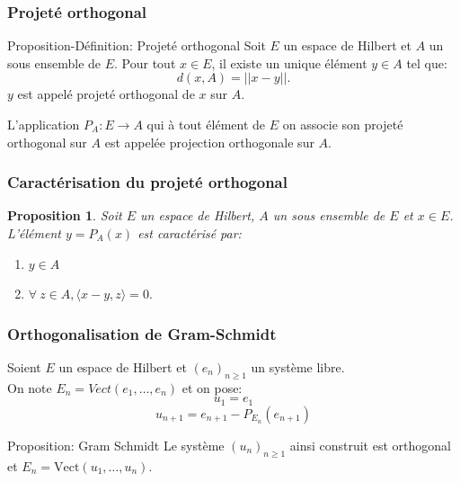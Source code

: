 \documentclass[xcolor=dvipsnames,10pt,mathserif]{beamer}
\theoremstyle{plain}
\newtheorem{pro}[thm]{Proposition}%
\newcommand{\la}{\langle}
\newcommand{\ra}{\rangle}
\begin{document}
\begin{frame} \frametitle{Projeté orthogonal \hfill \insertpagenumber}

\begin{block}{Proposition-Définition: Projeté orthogonal}
Soit $E$ un espace de Hilbert et $A$ un sous ensemble de $E$. Pour tout $x \in E$, il existe un unique élément $y\in A$ tel que: $$ d(x,A)=||x-y||.$$
$y$ est appelé projeté orthogonal de $x$ sur $A$.
\end{block}

L'application $P_A:E \longrightarrow A$ qui à tout élément de $E$ on associe son projeté orthogonal sur $A$ est appelée projection orthogonale sur $A$. 

\end{frame}
\begin{frame} \frametitle{Caractérisation du projeté orthogonal \hfill \insertpagenumber}

\begin{pro}
Soit $E$ un espace de Hilbert, $A$ un sous ensemble de $E$ et $x\in E$. L'élément $y=P_A(x)$ est caractérisé par:
\begin{enumerate}
\item $y\in A$
\item $\forall \ z \in A, \la x-y,z\ra=0.$
\end{enumerate}
\end{pro}

\end{frame}

\begin{frame} \frametitle{Orthogonalisation de Gram-Schmidt \hfill \insertpagenumber}

Soient $E$ un espace de Hilbert et $(e_n)_{n \geqslant 1}$ un système libre.\\On note $ E_n = Vect( e_1 , \dots, e_n)$ et on pose:
\begin{equation}
u_1 = e_1
\end{equation}
\begin{equation}
u_{n+1} = e_{n+1} - P_{E_n}(e_{n+1})
\end{equation} 
 
\begin{block}{Proposition: Gram Schmidt}
Le système $(u_n)_{n \geqslant 1}$ ainsi construit est orthogonal et $E_n=\text{Vect}(u_1, \dots, u_n )$.
\end{block}

\end{frame}
 
\end{document}
